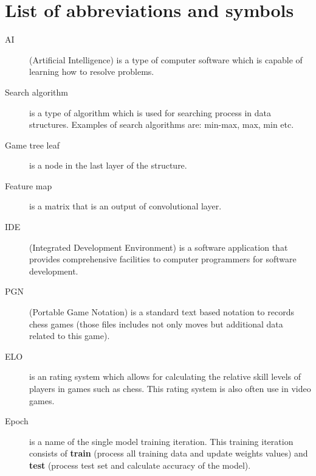 \chapter{List of abbreviations and symbols}

\begin{description}
    \item[AI] (Artificial Intelligence) is a type of computer software which is capable of learning how to resolve problems.
    \item[Search algorithm] is a type of algorithm which is used for searching process in data structures. Examples of search algorithms are: min-max, max, min etc.
    \item[Game tree leaf] is a node in the last layer of the structure.
    \item[Feature map] is a matrix that is an output of convolutional layer. 
    \item[IDE] (Integrated Development Environment) is a software application that provides comprehensive facilities to computer programmers for software development.
    \item[PGN] (Portable Game Notation) is a standard text based notation to records chess games (those files includes not only moves but additional data related to this game).
    \item[ELO] is an rating system which allows for calculating the relative skill levels of players in games such as chess. This rating system is also often use in video games.
    \item[Epoch] is a name of the single model training iteration. This training iteration consists of \textbf{train} (process all training data and update weights values) and \textbf{test} (process test set and calculate accuracy of the model).
\end{description}
